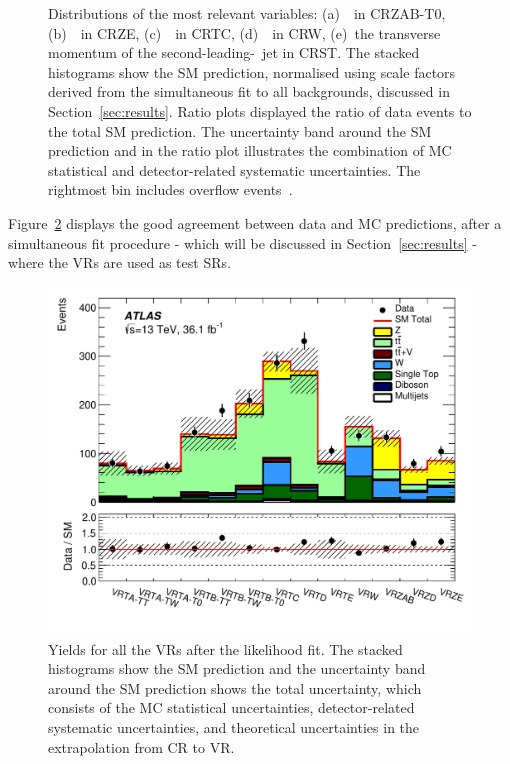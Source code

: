 \begin{figure}[!htb]
		    \caption{Distributions of the most relevant variables: (a)~\mttwoprime\ in CRZAB-T0, (b)~\metprime\ in CRZE, (c)~\rISR\ in CRTC, (d)~\mtbmax\ in CRW, (e)~the transverse momentum of the second-leading-\pT\ jet in CRST. The stacked histograms show the \ac{SM} prediction, normalised using scale factors derived from the simultaneous fit to all backgrounds, discussed in Section~\ref{sec:results}. Ratio plots displayed the ratio of data events to the total \ac{SM} prediction. The uncertainty band around the \ac{SM} prediction and in the ratio plot illustrates the combination of \ac{MC} statistical and detector-related systematic uncertainties. The rightmost bin includes overflow events~\cite{stop0L}.}
		    \label{fig:CRs}
		\end{figure}

 		Figure~\ref{fig:VRs} displays the good agreement between data and \ac{MC} predictions, after a simultaneous fit procedure - which will be discussed in Section~\ref{sec:results} - where the \acp{VR} are used as test \acp{SR}.

		\begin{figure}[!hbt]
		  \begin{center}
		    \includegraphics[width=.8\textwidth]{figures/stop/regionSummaryVR}
		    \caption{Yields for all the \acp{VR} after the likelihood fit. The stacked histograms show the \ac{SM} prediction and the uncertainty band around the \ac{SM} prediction shows the total uncertainty, which consists of the \ac{MC} statistical uncertainties, detector-related systematic uncertainties, and theoretical uncertainties in the extrapolation from \ac{CR} to \ac{VR}.} 
		    \label{fig:VRs}
		  \end{center}
		\end{figure}



